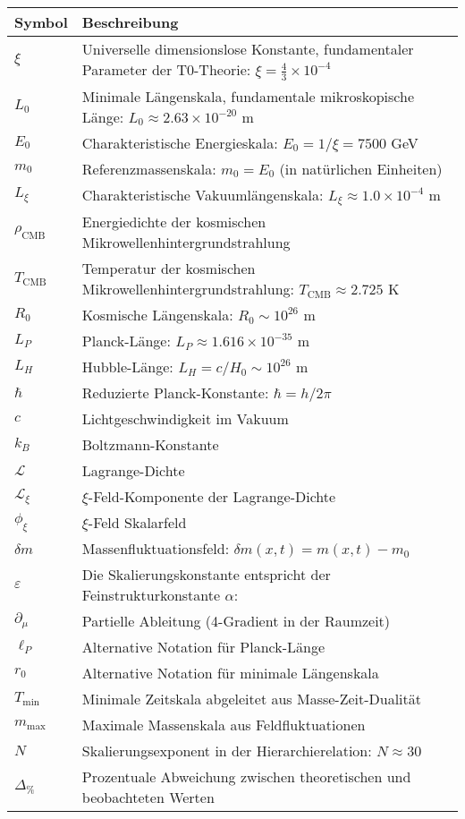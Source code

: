 \documentclass[12pt,a4paper]{article}
\numberwithin{equation}{section}
\begin{document}
	\begin{longtable}{p{2cm} p{12cm}}
		\toprule
		\textbf{Symbol} & \textbf{Beschreibung} \\
		\midrule
		\endhead
		
		$\xi$ & Universelle dimensionslose Konstante, fundamentaler Parameter der T0-Theorie: $\xi = \frac{4}{3} \times 10^{-4}$ \\
		$L_0$ & Minimale Längenskala, fundamentale mikroskopische Länge: $L_0 \approx 2.63 \times 10^{-20}$ m \\
		$E_0$ & Charakteristische Energieskala: $E_0 = 1/\xi = 7500$ GeV \\
		$m_0$ & Referenzmassenskala: $m_0 = E_0$ (in natürlichen Einheiten) \\
		$L_\xi$ & Charakteristische Vakuumlängenskala: $L_\xi \approx 1.0 \times 10^{-4}$ m \\
		$\rho_{\text{CMB}}$ & Energiedichte der kosmischen Mikrowellenhintergrundstrahlung \\
		$T_{\text{CMB}}$ & Temperatur der kosmischen Mikrowellenhintergrundstrahlung: $T_{\text{CMB}} \approx 2.725$ K \\
		$R_0$ & Kosmische Längenskala: $R_0 \sim 10^{26}$ m \\
		$L_P$ & Planck-Länge: $L_P \approx 1.616 \times 10^{-35}$ m \\
		$L_H$ & Hubble-Länge: $L_H = c/H_0 \sim 10^{26}$ m \\
		$\hbar$ & Reduzierte Planck-Konstante: $\hbar = h/2\pi$ \\
		$c$ & Lichtgeschwindigkeit im Vakuum \\
		$k_B$ & Boltzmann-Konstante \\
		$\mathcal{L}$ & Lagrange-Dichte \\
		$\mathcal{L}_{\xi}$ & $\xi$-Feld-Komponente der Lagrange-Dichte \\
		$\phi_\xi$ & $\xi$-Feld Skalarfeld \\
		$\delta m$ & Massenfluktuationsfeld: $\delta m(x,t) = m(x,t) - m_0$ \\
		$\varepsilon$ & Die Skalierungskonstante entspricht der Feinstrukturkonstante $\alpha$: \\
		$\partial_\mu$ & Partielle Ableitung (4-Gradient in der Raumzeit) \\
		$\ell_P$ & Alternative Notation für Planck-Länge \\
		$r_0$ & Alternative Notation für minimale Längenskala \\
		$T_{\text{min}}$ & Minimale Zeitskala abgeleitet aus Masse-Zeit-Dualität \\
		$m_{\text{max}}$ & Maximale Massenskala aus Feldfluktuationen \\
		$N$ & Skalierungsexponent in der Hierarchierelation: $N \approx 30$ \\
		$\Delta_{\%}$ & Prozentuale Abweichung zwischen theoretischen und beobachteten Werten \\
		\bottomrule
	\end{longtable}
	
\end{document}
